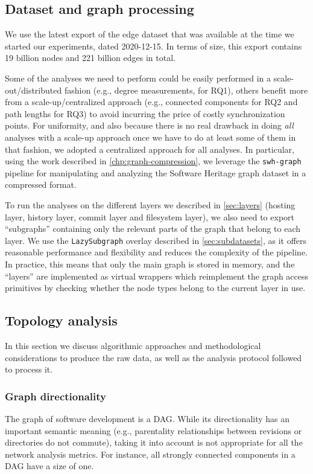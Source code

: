 \subsection{Dataset and graph processing}

We use the latest export of the edge dataset that was available at the time we
started our experiments, dated 2020-12-15. In terms of size, this export
contains 19 billion nodes and 221 billion edges in total.

Some of the analyses we need to perform could be easily performed in a
scale-out/distributed fashion (e.g., degree measurements, for RQ1), others
benefit more from a scale-up/centralized approach (e.g., connected components
for RQ2 and path lengths for RQ3) to avoid incurring the price of costly
synchronization points. For uniformity, and also because there is no real
drawback in doing \emph{all} analyses with a scale-up approach once we have to
do at least some of them in that fashion, we adopted a centralized approach for
all analyses.
In particular, using the work described in \cref{chp:graph-compression}, we
leverage the \texttt{swh-graph} pipeline for manipulating and analyzing the
Software Heritage graph dataset in a compressed format.

To run the analyses on the different layers we described in \cref{sec:layers}
(hosting layer, history layer, commit layer and filesystem layer), we also need
to export ``subgraphs'' containing only the relevant parts of the graph that
belong to each layer. We use the \texttt{LazySubgraph} overlay described in
\cref{sec:subdatasets}, as it offers reasonable performance and flexibility and
reduces the complexity of the pipeline.  In practice, this means that only the
main graph is stored in memory, and the ``layers'' are implemented as virtual
wrappers which reimplement the graph access primitives by checking whether the
node types belong to the current layer in use.

\subsection{Topology analysis}

In this section we discuss algorithmic approaches and methodological
considerations to produce the raw data, as well as the analysis protocol
followed to process it.

\subsubsection{Graph directionality}
The graph of software development is a \gls{DAG}. While its
directionality has an important semantic meaning (e.g., parentality
relationships between revisions or directories do not commute), taking it into
account is not appropriate for all the network analysis metrics.
For instance, all strongly connected components in a DAG have a size of one.

